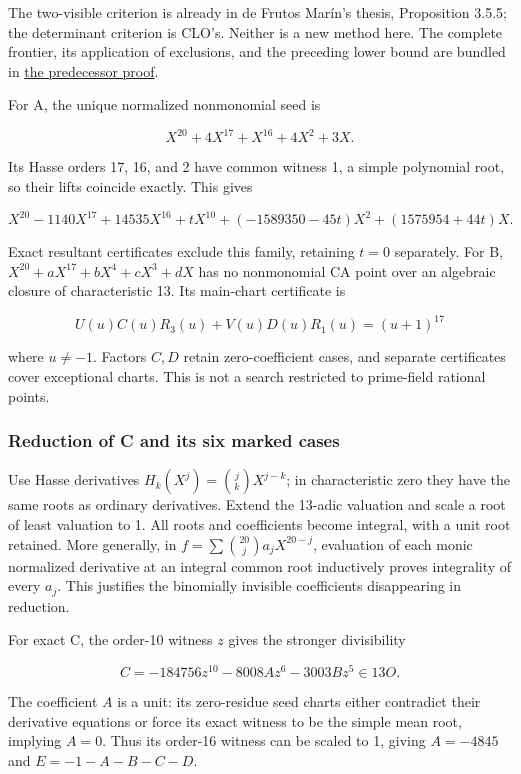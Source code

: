 \documentclass[
  british,
  10pt,
]{article}
\begin{document}
The two-visible criterion is already in de Frutos Marín's thesis,
Proposition 3.5.5; the determinant criterion is CLO's. Neither is a new
method here. The complete frontier, its application of exclusions, and
the preceding lower bound are bundled in
\href{evidence/seven-terms/dependencies/casas-alvero-sixterm/PROOF.md}{the
predecessor proof}.

For A, the unique normalized nonmonomial seed is

\[
X^{20}+4X^{17}+X^{16}+4X^2+3X.
\]

Its Hasse orders 17, 16, and 2 have common witness 1, a simple
polynomial root, so their lifts coincide exactly. This gives

\[
X^{20}-1140X^{17}+14535X^{16}+tX^{10}
 +(-1589350-45t)X^2+(1575954+44t)X.
\]

Exact resultant certificates exclude this family, retaining \(t=0\)
separately. For B, \(X^{20}+aX^{17}+bX^4+cX^3+dX\) has no nonmonomial CA
point over an algebraic closure of characteristic 13. Its main-chart
certificate is

\[
U(u)C(u)R_3(u)+V(u)D(u)R_1(u)=(u+1)^{17}
\]

where \(u\ne-1\). Factors \(C,D\) retain zero-coefficient cases, and
separate certificates cover exceptional charts. This is not a search
restricted to prime-field rational points.

\subsubsection{Reduction of C and its six marked
cases}\label{reduction-of-c-and-its-six-marked-cases}

Use Hasse derivatives \(H_k(X^j)=\binom jkX^{j-k}\); in characteristic
zero they have the same roots as ordinary derivatives. Extend the
13-adic valuation and scale a root of least valuation to 1. All roots
and coefficients become integral, with a unit root retained. More
generally, in \(f=\sum\binom{20}{j}a_jX^{20-j}\), evaluation of each
monic normalized derivative at an integral common root inductively
proves integrality of every \(a_j\). This justifies the binomially
invisible coefficients disappearing in reduction.

For exact C, the order-10 witness \(z\) gives the stronger divisibility

\[
C=-184756z^{10}-8008Az^6-3003Bz^5\in13O.
\]

The coefficient \(A\) is a unit: its zero-residue seed charts either
contradict their derivative equations or force its exact witness to be
the simple mean root, implying \(A=0\). Thus its order-16 witness can be
scaled to 1, giving \(A=-4845\) and \(E=-1-A-B-C-D\).
\end{document}
